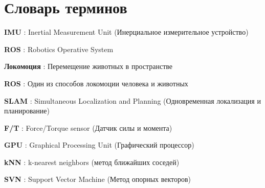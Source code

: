 \chapter*{Словарь терминов}             %

\textbf{IMU} : Inertial Measurement Unit (Инерциальное измерительное устройство)

\textbf{ROS} : Robotics Operative System

\textbf{Локомоция} : Перемещение животных в пространстве

\textbf{ROS} : Один из способов локомоции человека и животных

\textbf{SLAM} : Simultaneous Localization and Planning (Одновременная локализация и планирование)

\textbf{F/T} : Force/Torque sensor (Датчик силы и момента)

\textbf{GPU} : Graphical Processing Unit (Графический процессор)

\textbf{kNN} : k-nearest neighbors (метод ближайших соседей)

\textbf{SVN} : Support Vector Machine (Метод опорных векторов)